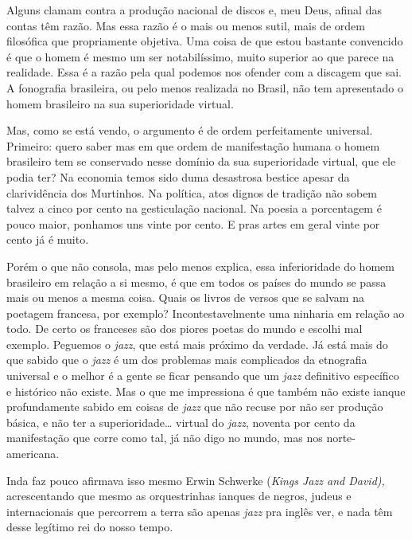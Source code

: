 

Alguns clamam contra a produção nacional de discos e, meu Deus, afinal
das contas têm razão. Mas essa razão é o mais ou menos sutil, mais de
ordem filosófica que propriamente objetiva. Uma coisa de que estou
bastante convencido é que o homem é mesmo um ser notabilíssimo, muito
superior ao que parece na realidade. Essa é a razão pela qual podemos
nos ofender com a discagem que sai. A fonografia brasileira, ou pelo
menos realizada no Brasil, não tem apresentado o homem brasileiro na sua
superioridade virtual.

Mas, como se está vendo, o argumento é de ordem perfeitamente universal.
Primeiro: quero saber mas em que ordem de manifestação humana o homem
brasileiro tem se conservado nesse domínio da sua superioridade virtual,
que ele podia ter? Na economia temos sido duma desastrosa bestice apesar
da clarividência dos Murtinhos. Na política, atos dignos de tradição não
sobem talvez a cinco por cento na gesticulação nacional. Na poesia a
porcentagem é pouco maior, ponhamos uns vinte por cento. E pras artes em
geral vinte por cento já é muito.

Porém o que não consola, mas pelo menos explica, essa inferioridade do
homem brasileiro em relação a si mesmo, é que em todos os países do
mundo se passa mais ou menos a mesma coisa. Quais os livros de versos
que se salvam na poetagem francesa, por exemplo? Incontestavelmente uma
ninharia em relação ao todo. De certo os franceses são dos piores poetas
do mundo e escolhi mal exemplo. Peguemos o \emph{jazz}, que está mais
próximo da verdade. Já está mais do que sabido que o \emph{jazz} é um
dos problemas mais complicados da etnografia universal e o melhor é a
gente se ficar pensando que um \emph{jazz} definitivo específico e
histórico não existe. Mas o que me impressiona é que também não existe
ianque profundamente sabido em coisas de \emph{jazz} que não recuse por
não ser produção básica, e não ter a superioridade\ldots{} virtual do
\emph{jazz}, noventa por cento da manifestação que corre como tal, já
não digo no mundo, mas nos norte-americana.

Inda faz pouco afirmava isso mesmo Erwin Schwerke (\emph{Kings Jazz and
David),} acrescentando que mesmo as orquestrinhas ianques de negros,
judeus e internacionais que percorrem a terra são apenas \emph{jazz} pra
inglês ver, e nada têm desse legítimo rei do nosso tempo.

